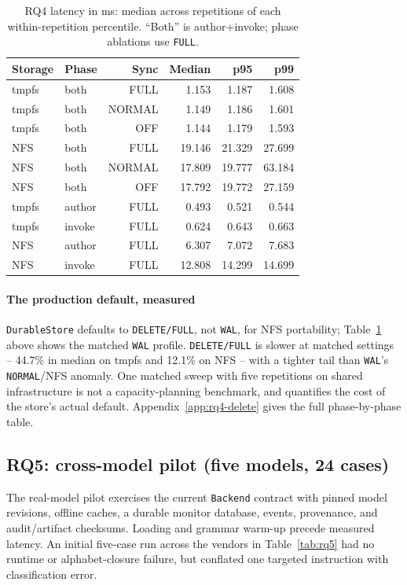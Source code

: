 \documentclass[conference,compsoc]{IEEEtran}
\begin{document}
\begin{table}[h]
\centering
\small
\caption{RQ4 latency in ms: median across repetitions of each within-repetition percentile. ``Both'' is author+invoke; phase ablations use \texttt{FULL}.}
\label{tab:rq4}
\begin{tabular}{llrrrr}
\hline
Storage & Phase & Sync & Median & p95 & p99 \\
\hline
tmpfs & both & FULL & 1.153 & 1.187 & 1.608 \\
tmpfs & both & NORMAL & 1.149 & 1.186 & 1.601 \\
tmpfs & both & OFF & 1.144 & 1.179 & 1.593 \\
NFS & both & FULL & 19.146 & 21.329 & 27.699 \\
NFS & both & NORMAL & 17.809 & 19.777 & 63.184 \\
NFS & both & OFF & 17.792 & 19.772 & 27.159 \\
tmpfs & author & FULL & 0.493 & 0.521 & 0.544 \\
tmpfs & invoke & FULL & 0.624 & 0.643 & 0.663 \\
NFS & author & FULL & 6.307 & 7.072 & 7.683 \\
NFS & invoke & FULL & 12.808 & 14.299 & 14.699 \\
\hline
\end{tabular}
\end{table}

\paragraph{The production default, measured} \texttt{DurableStore}
defaults to \texttt{DELETE/FULL}, not \texttt{WAL}, for NFS portability;
Table~\ref{tab:rq4} above shows the matched \texttt{WAL} profile.
\texttt{DELETE/FULL} is slower at matched settings -- 44.7\% in median on
tmpfs and 12.1\% on NFS -- with a tighter tail than
\texttt{WAL}'s \texttt{NORMAL}/NFS anomaly. One matched sweep with five
repetitions on shared infrastructure is not a capacity-planning benchmark, and quantifies the cost of the store's actual default.
Appendix~\ref{app:rq4-delete} gives the full phase-by-phase table.

\subsection{RQ5: cross-model pilot (five models, 24 cases)}
The real-model pilot exercises the current \texttt{Backend} contract with pinned model revisions, offline caches, a durable monitor database, events, provenance, and audit/artifact checksums. Loading and grammar warm-up precede measured latency. An initial five-case run across the vendors in Table~\ref{tab:rq5} had no runtime or alphabet-closure failure, but conflated one targeted instruction with classification error.
\end{document}
